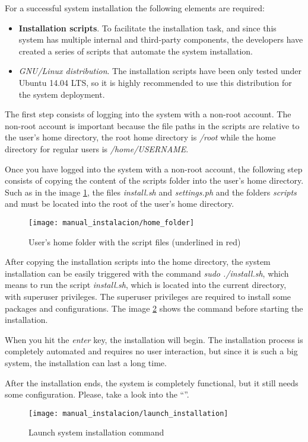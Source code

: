 For a successful system installation the following elements are required:


\begin{itemize}
	\item \textbf{Installation scripts}.  To facilitate the installation task, and since this system has multiple internal and third-party components,  the developers have created a series of scripts that automate the system installation.
	\item \textit{GNU/Linux distribution}.  The installation scripts have been only tested under Ubuntu 14.04 LTS, so it is highly recommended to use this distribution for the system deployment.
\end{itemize}

The first step consists of logging into the system with a non-root account.  The non-root account is important because the file paths in the scripts are relative to the user's home directory, the root home directory is \textit{/root} while the home directory for regular users is \textit{/home/USERNAME}.

Once you have logged into the system with a non-root account, the following step consists of copying the content of the scripts folder into the user's home directory.  Such as in the image \ref{fig:manual_instalacion_home}, the files \textit{install.sh} and \textit{settings.ph} and the folders \textit{scripts} and  must be located into the root of the user's home directory.

\begin{figure}[h]
	\centering
	\texttt{[image: manual\_instalacion/home\_folder]}
	\caption{User's home folder with the script files (underlined in red)}
	\label{fig:manual_instalacion_home}
\end{figure}

After copying the installation scripts into the home directory, the system installation can be easily triggered with the command \textit{sudo ./install.sh}, which means to run the script \textit{install.sh}, which is located into the current directory, with superuser privileges.  The superuser privileges are required to install some packages and configurations.  The image \ref{fig:manual_instalacion_lanzamiento} shows the command before starting the installation.

When you hit the \textit{enter} key, the installation will begin.  The installation process is completely automated and requires no user interaction, but since it is such a big system, the installation can last a long time.

After the installation ends, the system is completely functional, but it still needs some configuration.  Please, take a look into the ``''.

\begin{figure}[h]
	\centering
	\texttt{[image: manual\_instalacion/launch\_installation]}
	\caption{Launch system installation command}
	\label{fig:manual_instalacion_lanzamiento}
\end{figure}